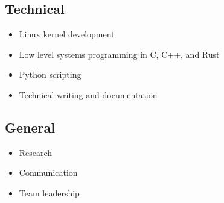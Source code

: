 \documentclass[
    10pt,
]
{article}
\begin{document}
\begin{figure}
\begin{minipage}[t]{0.32\textwidth}
\subsection{Technical}
\begin{itemize}[itemsep=0em]
    \item Linux kernel development
    \item Low level systems programming in C, C++, and Rust
    \item Python scripting
    \item Technical writing and documentation
\end{itemize}
\subsection{General}
\begin{itemize}[itemsep=0em]
    \item Research
    \item Communication
    \item Team leadership
\end{itemize}

\end{minipage}
\end{figure}









\end{document}
